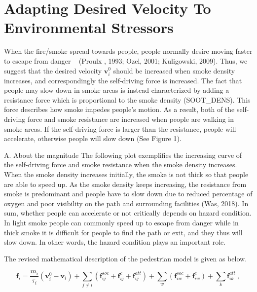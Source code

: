 \documentclass{article}
\begin{document}
\section{Adapting Desired Velocity To Environmental Stressors}

When the fire/smoke spread towards people, people normally desire moving faster to escape from danger ~\cite{Proulx1993, Ozel2001} (Proulx , 1993; Ozel, 2001; Kuligowski, 2009).  Thus, we suggest that the desired velocity $\mathbf{v}_i^0$ should be increased when smoke density increases, and correspondingly the self-driving force is increased.  The fact that people may slow down in smoke areas is instead characterized by adding a resistance force which is proportional to the smoke density (SOOT_DENS).  This force describes how smoke impedes people's motion.  As a result, both of the self-driving force and smoke resistance are increased when people are walking in smoke areas.  If the self-driving force is larger than the resistance, people will accelerate, otherwise people will slow down (See Figure 1).  


A. About the magnitude
    The following plot exemplifies the increasing curve of the self-driving force and smoke resistance when the smoke density increases.  When the smoke density increases initially, the smoke is not thick so that people are able to speed up.  As the smoke density keeps increasing, the resistance from smoke is predominant and people have to slow down due to reduced percentage of oxygen and poor visibility on the path and surrounding facilities (Was, 2018).  In sum, whether people can accelerate or not critically depends on hazard condition.  In light smoke people can commonly speed up to escape from danger while in thick smoke it is difficult for people to find the path or exit, and they thus will slow down.  In other words, the hazard condition plays an important role.   
	
    The revised mathematical description of the pedestrian model is given as below.  
	
\begin{equation}\label{Eq_force}
  \mathbf{f}_i = \frac{m_i}{\tau_i} \left( \mathbf{v}_i^0 -
    \mathbf{v}_i\right) + \sum_{j \ne i} \left( \mathbf{f}_{ij}^{soc}
    + \mathbf{f}_{ij}^{c} + \mathbf{f}_{ij}^{att} \right) + \sum_{w}
  \left( \mathbf{f}^{soc}_{iw} + \mathbf{f}^{c}_{iw} \right) + \sum_{k}
  \mathbf{f}_{ik}^{att} ~,
\end{equation}
	
\end{document}
